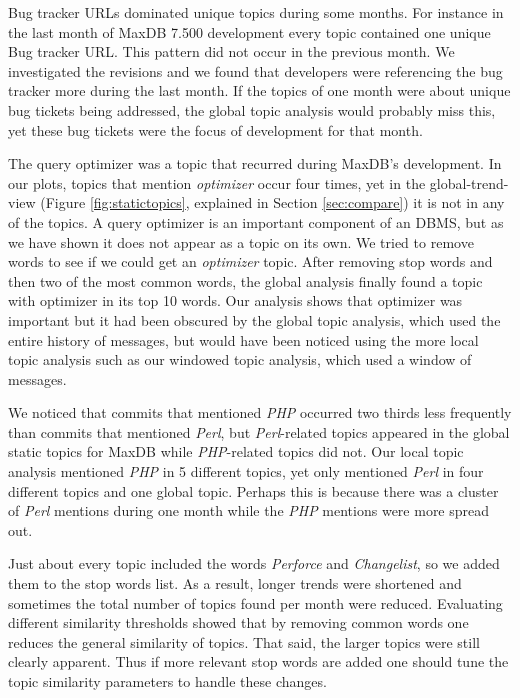 \documentclass[times, 10pt,twocolumn]{article}
\begin{document}
Bug tracker URLs dominated unique topics during some months. For
instance in the last month of MaxDB 7.500 development every topic
contained one unique Bug tracker URL. This pattern did not occur in the
previous month. We investigated the revisions and we found that
developers were referencing the bug tracker more during the last
month.  If the topics of one month were about unique bug tickets being
addressed, the global topic analysis would probably miss this, yet
these bug tickets were the focus of development for that month.

The query optimizer was a topic that recurred during MaxDB's
development. In our plots, topics that mention \emph{optimizer} occur
four times, yet in the global-trend-view (Figure
\ref{fig:statictopics}, explained in Section \ref{sec:compare}) it is not in any of the topics. A query
optimizer is an important component of an DBMS, but as we have shown
it does not appear as a topic on its own. We tried to remove words to
see if we could get an \emph{optimizer} topic. After removing stop
words and then two of the most common words, the global analysis
finally found a topic with optimizer in its top 10 words. Our
analysis shows that optimizer was important but it had been obscured
by the global topic analysis, which used the entire history of
messages, but would have been noticed using the more local topic
analysis such as our windowed topic analysis, which used a window of
messages.


We noticed that commits that mentioned \emph{PHP} occurred two thirds
less frequently than commits that mentioned \emph{Perl}, but
\emph{Perl}-related topics appeared in the global static topics for
MaxDB while \emph{PHP}-related topics did not.  Our local topic
analysis mentioned \emph{PHP} in 5 different topics, yet only
mentioned \emph{Perl} in four different topics and one global
topic. Perhaps this is because there was a cluster of \emph{Perl}
mentions during one month while the \emph{PHP} mentions were more
spread out.

Just about every topic included the words \emph{Perforce} and
\emph{Changelist}, so we added them to the stop words list. As a
result, longer trends were shortened and sometimes the total number of
topics found per month were reduced.  Evaluating different similarity
thresholds showed that by removing common words one reduces the
general similarity of topics. That said, the larger topics were still
clearly apparent. Thus if more relevant stop words are added one
should tune the topic similarity parameters to handle these changes.
\end{document}
